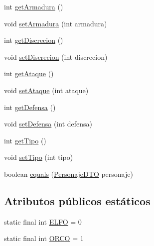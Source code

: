 \begin{DoxyCompactItemize}
\item 
int \hyperlink{classes_1_1deusto_1_1spq_1_1_t_e_scc_1_1dto_1_1_personaje_d_t_o_a43ec12367b00d6367f37e18ad25c8abd}{get\+Armadura} ()
\item 
void \hyperlink{classes_1_1deusto_1_1spq_1_1_t_e_scc_1_1dto_1_1_personaje_d_t_o_a5c64f90d1de1a2f712a424bcae9178e3}{set\+Armadura} (int armadura)
\item 
int \hyperlink{classes_1_1deusto_1_1spq_1_1_t_e_scc_1_1dto_1_1_personaje_d_t_o_ad3d0c6a88f3715400c314957b36cd5e7}{get\+Discrecion} ()
\item 
void \hyperlink{classes_1_1deusto_1_1spq_1_1_t_e_scc_1_1dto_1_1_personaje_d_t_o_afb6383e8aca861d054379fb6aee3b3ca}{set\+Discrecion} (int discrecion)
\item 
int \hyperlink{classes_1_1deusto_1_1spq_1_1_t_e_scc_1_1dto_1_1_personaje_d_t_o_aa31b8ee6d310a16d10738535356b93a5}{get\+Ataque} ()
\item 
void \hyperlink{classes_1_1deusto_1_1spq_1_1_t_e_scc_1_1dto_1_1_personaje_d_t_o_abf399cf831b709f9d49f95f1caeeb754}{set\+Ataque} (int ataque)
\item 
int \hyperlink{classes_1_1deusto_1_1spq_1_1_t_e_scc_1_1dto_1_1_personaje_d_t_o_a585a1721133f4541a5eeec25a6aa7ea0}{get\+Defensa} ()
\item 
void \hyperlink{classes_1_1deusto_1_1spq_1_1_t_e_scc_1_1dto_1_1_personaje_d_t_o_a742dd48266124f206395464cbde04b7f}{set\+Defensa} (int defensa)
\item 
int \hyperlink{classes_1_1deusto_1_1spq_1_1_t_e_scc_1_1dto_1_1_personaje_d_t_o_a1acc4fe9a701ca2828d6fd6e33a9d215}{get\+Tipo} ()
\item 
void \hyperlink{classes_1_1deusto_1_1spq_1_1_t_e_scc_1_1dto_1_1_personaje_d_t_o_a885cbb0358d07b317c8c0f2a8b4c73f7}{set\+Tipo} (int tipo)
\item 
boolean \hyperlink{classes_1_1deusto_1_1spq_1_1_t_e_scc_1_1dto_1_1_personaje_d_t_o_a439967085bb77cb822bdae1b7fcd372e}{equals} (\hyperlink{classes_1_1deusto_1_1spq_1_1_t_e_scc_1_1dto_1_1_personaje_d_t_o}{Personaje\+D\+T\+O} personaje)
\end{DoxyCompactItemize}
\subsection*{Atributos públicos estáticos}
\begin{DoxyCompactItemize}
\item 
static final int \hyperlink{classes_1_1deusto_1_1spq_1_1_t_e_scc_1_1dto_1_1_personaje_d_t_o_a4fae9f6ba64b6976e251df09c56d58eb}{E\+L\+F\+O} = 0
\item 
static final int \hyperlink{classes_1_1deusto_1_1spq_1_1_t_e_scc_1_1dto_1_1_personaje_d_t_o_af6b6d74e020103d4cd1b9434ec24454b}{O\+R\+C\+O} = 1
\end{DoxyCompactItemize}


